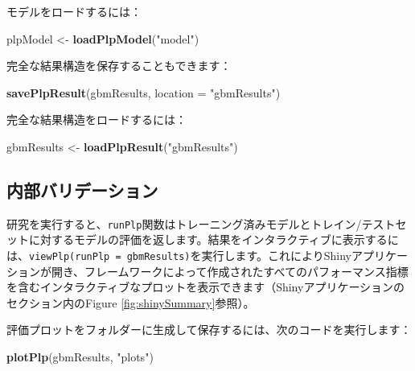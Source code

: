 \documentclass[
  11pt]{book}
\newenvironment{Shaded}{\begin{snugshade}}{\end{snugshade}}
\newcommand{\AttributeTok}[1]{\textcolor[rgb]{0.13,0.29,0.53}{#1}}
\newcommand{\FunctionTok}[1]{\textcolor[rgb]{0.13,0.29,0.53}{\textbf{#1}}}
\newcommand{\NormalTok}[1]{#1}
\newcommand{\OtherTok}[1]{\textcolor[rgb]{0.56,0.35,0.01}{#1}}
\newcommand{\StringTok}[1]{\textcolor[rgb]{0.31,0.60,0.02}{#1}}
\theoremstyle{definition}
\theoremstyle{definition}
\theoremstyle{definition}
\theoremstyle{definition}
\theoremstyle{remark}
\begin{document}
モデルをロードするには：

\begin{Shaded}
\begin{Highlighting}[]
\NormalTok{plpModel }\OtherTok{\textless{}{-}} \FunctionTok{loadPlpModel}\NormalTok{(}\StringTok{"model"}\NormalTok{)}
\end{Highlighting}
\end{Shaded}

完全な結果構造を保存することもできます：

\begin{Shaded}
\begin{Highlighting}[]
\FunctionTok{savePlpResult}\NormalTok{(gbmResults, }\AttributeTok{location =} \StringTok{"gbmResults"}\NormalTok{)}
\end{Highlighting}
\end{Shaded}

完全な結果構造をロードするには：

\begin{Shaded}
\begin{Highlighting}[]
\NormalTok{gbmResults }\OtherTok{\textless{}{-}} \FunctionTok{loadPlpResult}\NormalTok{(}\StringTok{"gbmResults"}\NormalTok{)}
\end{Highlighting}
\end{Shaded}

\subsection{内部バリデーション}\label{ux5185ux90e8ux30d0ux30eaux30c7ux30fcux30b7ux30e7ux30f3}

研究を実行すると、\texttt{runPlp}関数はトレーニング済みモデルとトレイン/テストセットに対するモデルの評価を返します。結果をインタラクティブに表示するには、\texttt{viewPlp(runPlp\ =\ gbmResults)}を実行します。これによりShinyアプリケーションが開き、フレームワークによって作成されたすべてのパフォーマンス指標を含むインタラクティブなプロットを表示できます（Shinyアプリケーションのセクション内のFigure \ref{fig:shinySummary}参照）。

評価プロットをフォルダーに生成して保存するには、次のコードを実行します：

\begin{Shaded}
\begin{Highlighting}[]
\FunctionTok{plotPlp}\NormalTok{(gbmResults, }\StringTok{"plots"}\NormalTok{)}
\end{Highlighting}
\end{Shaded}
\end{document}
